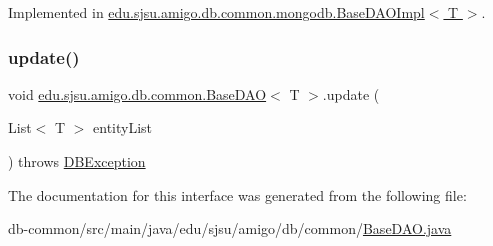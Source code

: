 Implemented in \hyperlink{classedu_1_1sjsu_1_1amigo_1_1db_1_1common_1_1mongodb_1_1_base_d_a_o_impl_ac8ca9075d687d809293f54749f92c7e9}{edu.\+sjsu.\+amigo.\+db.\+common.\+mongodb.\+Base\+D\+A\+O\+Impl$<$ T $>$}.

\mbox{\label{interfaceedu_1_1sjsu_1_1amigo_1_1db_1_1common_1_1_base_d_a_o_a8204c75fed7b773eafba11a6a7d9d689}} 
\subsubsection{\texorpdfstring{update()}{update()}}
{\footnotesize\ttfamily void \hyperlink{interfaceedu_1_1sjsu_1_1amigo_1_1db_1_1common_1_1_base_d_a_o}{edu.\+sjsu.\+amigo.\+db.\+common.\+Base\+D\+AO}$<$ T $>$.update (\begin{DoxyParamCaption}\item[{List$<$ T $>$}]{entity\+List }\end{DoxyParamCaption}) throws \hyperlink{classedu_1_1sjsu_1_1amigo_1_1db_1_1common_1_1_d_b_exception}{D\+B\+Exception}}



The documentation for this interface was generated from the following file\+:\begin{DoxyCompactItemize}
\item 
db-\/common/src/main/java/edu/sjsu/amigo/db/common/\hyperlink{_base_d_a_o_8java}{Base\+D\+A\+O.\+java}\end{DoxyCompactItemize}
